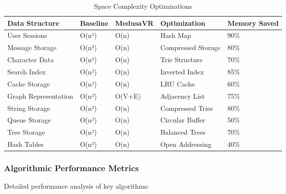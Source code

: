 \documentclass[conference]{IEEEtran}
\begin{document}
\FloatBarrier
\begin{table}[H]
\centering
\caption{Space Complexity Optimizations}
\label{tab:space_optimizations}
\vspace{0.2in}
\begin{tabular}{|p{2.2cm}|p{1.5cm}|p{1.5cm}|p{2.0cm}|p{1.8cm}|}
\hline
\textbf{Data Structure} & \textbf{Baseline} & \textbf{MedusaVR} & \textbf{Optimization} & \textbf{Memory Saved} \\
\hline
User Sessions & O(n²) & O(n) & Hash Map & 90\% \\
Message Storage & O(n²) & O(n) & Compressed Storage & 80\% \\
Character Data & O(n²) & O(n) & Trie Structure & 70\% \\
Search Index & O(n²) & O(n) & Inverted Index & 85\% \\
Cache Storage & O(n²) & O(n) & LRU Cache & 60\% \\
Graph Representation & O(n²) & O(V+E) & Adjacency List & 75\% \\
String Storage & O(n²) & O(n) & Compressed Tries & 80\% \\
Queue Storage & O(n²) & O(n) & Circular Buffer & 50\% \\
Tree Storage & O(n²) & O(n) & Balanced Trees & 70\% \\
Hash Tables & O(n²) & O(n) & Open Addressing & 40\% \\
\hline
\end{tabular}
\vspace{0.2in}
\end{table}

\vspace{0.1in}
\subsubsection{Algorithmic Performance Metrics}
Detailed performance analysis of key algorithms:
\end{document}
